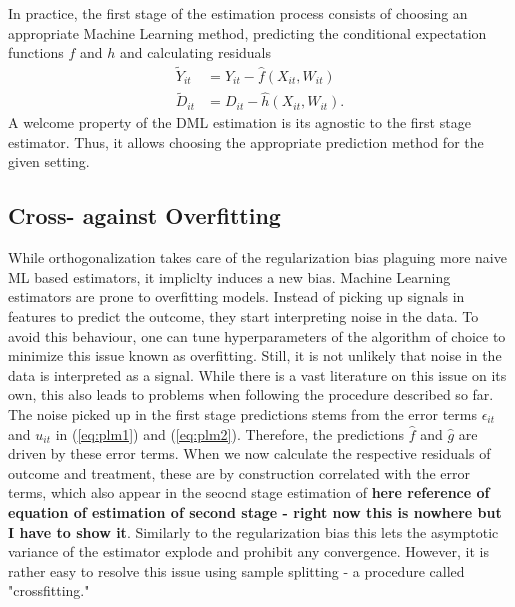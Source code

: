 In practice, the first stage of the estimation process consists of choosing an appropriate Machine Learning method, predicting the conditional expectation functions $f$ and $h$ and calculating residuals 
\begin{align*} 
    \tilde{Y}_{it}&=Y_{it}-\hat{f}(X_{it}, W_{it}) \\ 
    \tilde{D}_{it}&=D_{it}-\hat{h}(X_{it}, W_{it}).
\end{align*}
A welcome property of the DML estimation is its agnostic to the first stage estimator. Thus, it allows choosing the appropriate prediction method for the given setting. 

\subsection{Cross- against Overfitting} \label{sec:cross-fitting}
While orthogonalization takes care of the regularization bias plaguing more naive ML based estimators, it impliclty induces a new bias. Machine Learning estimators are prone to overfitting models. Instead of picking up signals in features to predict the outcome, they start interpreting noise in the data. To avoid this behaviour, one can tune hyperparameters of the algorithm of choice to minimize this issue known as overfitting. Still, it is not unlikely that noise in the data is interpreted as a signal. While there is a vast literature on this issue on its own, this also leads to problems when following the procedure described so far. \\
The noise picked up in the first stage predictions stems from the error terms $\epsilon_{it}$ and $u_{it}$ in (\ref{eq:plm1}) and (\ref{eq:plm2}). Therefore, the predictions $\hat{f}$ and $\hat{g}$ are driven by these error terms. When we now calculate the respective residuals of outcome and treatment, these are by construction correlated with the error terms, which also appear in the seocnd stage estimation of \textbf{here reference of equation of estimation of second stage - right now this is nowhere but I have to show it}. Similarly to the regularization bias this lets the asymptotic variance of the estimator explode and prohibit any convergence. However, it is rather easy to resolve this issue using sample splitting - a procedure called "crossfitting." \\ 
